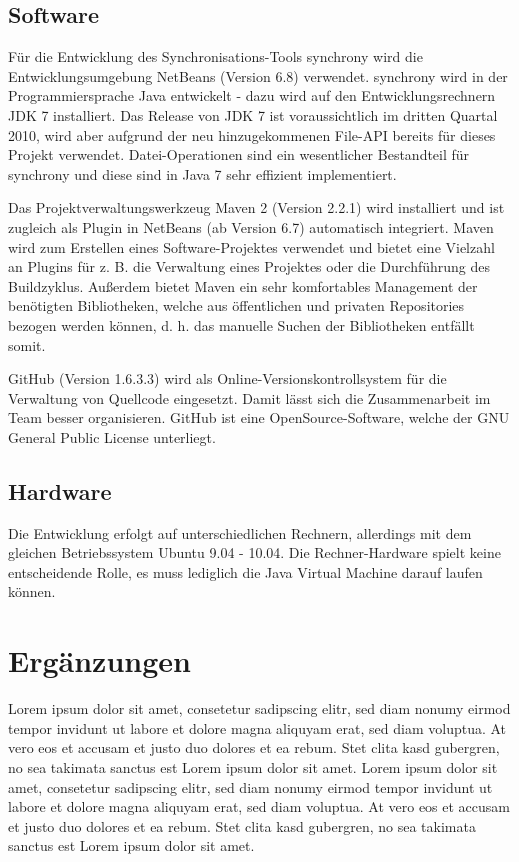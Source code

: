 \documentclass[12pt,oneside,a4paper,bibtotoc,liststotoc,pointlessnumbers]{scrartcl}
\begin{document}
\subsection{Software}
Für die Entwicklung des Synchronisations-Tools synchrony wird die Entwicklungsumgebung NetBeans (Version 6.8) verwendet.
synchrony wird in der Programmiersprache Java entwickelt - dazu wird auf den Entwicklungsrechnern JDK 7 installiert.
Das Release von JDK 7 ist voraussichtlich im dritten Quartal 2010, wird aber aufgrund der neu hinzugekommenen File-API bereits für
dieses Projekt verwendet. Datei-Operationen sind ein wesentlicher Bestandteil für synchrony und diese sind in Java 7 sehr effizient
implementiert.

Das Projektverwaltungswerkzeug Maven 2 (Version 2.2.1) wird installiert und ist zugleich als Plugin in NetBeans (ab Version 6.7) automatisch
integriert. Maven wird zum Erstellen eines Software-Projektes verwendet und bietet eine Vielzahl an Plugins für z. B. die Verwaltung eines
Projektes oder die Durchführung des Buildzyklus. Außerdem bietet Maven ein sehr komfortables Management der benötigten Bibliotheken, welche
aus öffentlichen und privaten Repositories bezogen werden können, d. h. das manuelle Suchen der Bibliotheken entfällt somit.

GitHub (Version 1.6.3.3) wird als Online-Versionskontrollsystem für die Verwaltung von Quellcode eingesetzt. Damit lässt sich die Zusammenarbeit im
Team besser organisieren. GitHub ist eine OpenSource-Software, welche der GNU General Public License unterliegt.

\subsection{Hardware}
Die Entwicklung erfolgt auf unterschiedlichen Rechnern, allerdings mit dem gleichen Betriebssystem Ubuntu 9.04 - 10.04.
Die Rechner-Hardware spielt keine entscheidende Rolle, es muss lediglich die Java Virtual Machine darauf laufen können. 

\newpage
\section{Ergänzungen}
Lorem ipsum dolor sit amet, consetetur sadipscing elitr, sed diam nonumy eirmod tempor invidunt ut labore et dolore magna aliquyam erat, sed diam voluptua. At vero eos et accusam et justo duo dolores et ea rebum. Stet clita kasd gubergren, no sea takimata sanctus est Lorem ipsum dolor sit amet. Lorem ipsum dolor sit amet, consetetur sadipscing elitr, sed diam nonumy eirmod tempor invidunt ut labore et dolore magna aliquyam erat, sed diam voluptua. At vero eos et accusam et justo duo dolores et ea rebum. Stet clita kasd gubergren, no sea takimata sanctus est Lorem ipsum dolor sit amet.
\newpage
\end{document}
